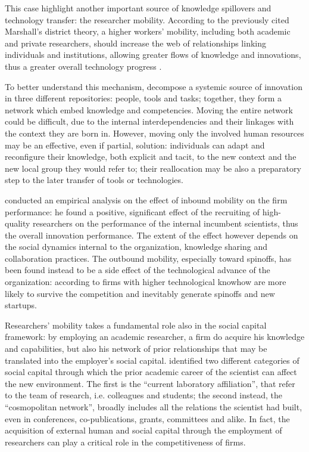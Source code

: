 This case highlight another important source of knowledge spillovers and technology transfer: the researcher mobility. According to the previously cited Marshall's district theory, a higher workers' mobility, including both academic and private researchers, should increase the web of relationships linking individuals and institutions, allowing greater flows of knowledge and innovations, thus a greater overall technology progress \citep{Cantner2006}.

To better understand this mechanism, \citet{Argote2000} decompose a systemic source of innovation in three different repositories: people, tools and tasks; together, they form a network which embed knowledge and competencies. Moving the entire network could be difficult, due to the internal interdependencies and their linkages with the context they are born in. However, moving only the involved human resources may be an effective, even if partial, solution: individuals can adapt and reconfigure their knowledge, both explicit and tacit, to the new context and the new local group they would refer to; their reallocation may be also a preparatory step to the later transfer of tools or technologies. 

\citet{Slavova2015} conducted an empirical analysis on the effect of inbound mobility on the firm performance: he found a positive, significant effect of the recruiting of high-quality researchers on the performance of the internal incumbent scientists, thus the overall innovation performance. The extent of the effect however depends on the social dynamics internal to the organization, knowledge sharing and collaboration practices. The outbound mobility, especially toward spinoffs, has been found instead to be a side effect of the technological advance of the organization: according to \citet{Franco2000} firms with higher technological knowhow are more likely to survive the competition and inevitably generate spinoffs and new startups.

Researchers' mobility takes a fundamental role also in the social capital framework: by employing an academic researcher, a firm do acquire his knowledge and capabilities, but also his network of prior relationships that may be translated into the employer's social capital. \citet{Murray2004} identified two different categories of social capital through which the prior academic career of the scientist can affect the new environment. The first is the \enquote{current laboratory affiliation}, that refer to the team of research, i.e. colleagues and students; the second instead, the \enquote{cosmopolitan network}, broadly includes all the relations the scientist had built, even in conferences, co-publications, grants, committees and alike. In fact, the acquisition of external human and social capital through the employment of researchers can play a critical role in the competitiveness of firms.

